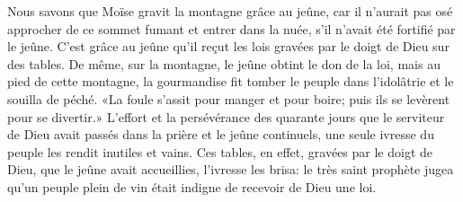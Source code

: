 Nous savons que Moïse gravit la montagne grâce au jeûne,
	car il n’aurait pas osé approcher de ce sommet fumant
		et entrer dans la nuée,
	s’il n’avait été fortifié par le jeûne.
C’est grâce au jeûne qu’il reçut les lois
	gravées par le doigt de Dieu sur des tables.
De même, sur la montagne, le jeûne obtint le don de la loi,
	mais au pied de cette montagne,
	la gourmandise fit tomber le peuple dans l’idolâtrie et le souilla de péché.
«La foule s’assit pour manger et pour boire;
	puis ils se levèrent pour se divertir.»
L’effort et la persévérance des quarante jours
	que le serviteur de Dieu avait passés dans la prière et le jeûne continuels,
	une seule ivresse du peuple les rendit inutiles et vains.
Ces tables, en effet, gravées par le doigt de Dieu,
	que le jeûne avait accueillies,
	l’ivresse les brisa:
	le très saint prophète jugea qu’un peuple plein de vin
	était indigne de recevoir de Dieu une loi.
